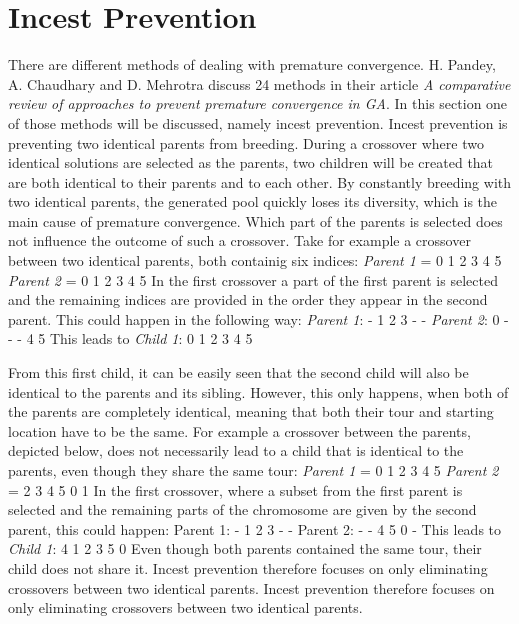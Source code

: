 \section{Incest Prevention}

\par
There are different methods of dealing with premature convergence. H. Pandey, A. Chaudhary and D. Mehrotra discuss 24 methods in their article \textit{A comparative review of approaches to prevent premature convergence in GA}\cite{Premconvergence}. In this section one of those methods will be discussed, namely incest prevention. Incest prevention is preventing two identical parents from breeding. During a crossover where two identical solutions are selected as the parents, two children will be created that are both identical to their parents and to each other. By constantly breeding with two identical parents, the generated pool quickly loses its diversity, which is the main cause of premature convergence. Which part of the parents is selected does not influence the outcome of such a crossover. Take for example a crossover between two identical parents, both containig six indices:
\newline
\textit{Parent 1} =  0 1 2 3 4 5 
\newline
\textit{Parent 2} =  0 1 2 3 4 5 
\newline
In the first crossover a part of the first parent is selected and the remaining indices are provided in the order they appear in the second parent. This could happen in the following way: 
\newline
\textit{Parent 1}: - 1 2 3 - -                 
\newline
\textit{Parent 2}: 0 - - - 4 5
\newline
This leads to \textit{Child 1}: 0 1 2 3 4 5

\par
From this first child, it can be easily seen that the second child will also be identical to the parents and its sibling. However, this only happens, when both of the parents are completely identical, meaning that both their tour and starting location have to be the same. For example a crossover between the parents, depicted below, does not necessarily lead to a child that is identical to the parents, even though they share the same tour:
\newline
\textit{Parent 1} =  0 1 2 3 4 5 
\textit{Parent 2} =  2 3 4 5 0 1 
In the first crossover, where a subset from the first parent is selected and the remaining parts of the chromosome are given by the second parent, this could happen:
 \newline
Parent 1: - 1 2 3 - -                 
\newline
Parent 2: - - 4 5 0 -
\newline
This leads to \textit{Child 1}: 4 1 2 3 5 0
 \newline
Even though both parents contained the same tour, their child does not share it. Incest prevention therefore focuses on only eliminating crossovers between two identical parents. Incest prevention therefore focuses on only eliminating crossovers between two identical parents.

